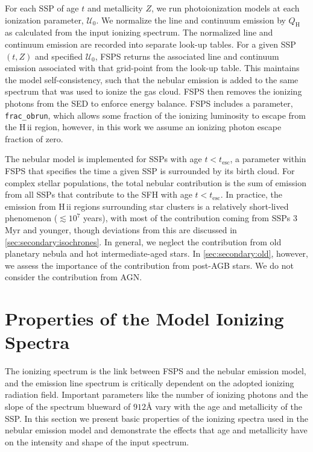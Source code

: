 \documentclass[twocolumn, tighten]{aastex61}
\newcommand{\Sec}[1]{\autoref{sec:#1}}
\newcommand{\FSPS}{{\sc FSPS}\xspace}
\newcommand{\hii}{H\,{\sc ii}\xspace}
\newcommand{\ang}{\ensuremath{\mbox{\AA}}}
\newcommand{\QH}{\ensuremath{Q_{\mathrm{H}}}}
\newcommand{\U}{\ensuremath{\mathcal{U}_{0}}}
\begin{document}
For each SSP of age $t$ and metallicity $Z$, we run photoionization models at each ionization parameter, \U{}. We normalize the line and continuum emission by \QH{} as calculated from the input ionizing spectrum. The normalized line and continuum emission are recorded into separate look-up tables. For a given SSP $(t, Z)$ and specified \U{}, \FSPS returns the associated line and continuum emission associated with that grid-point from the look-up table. This maintains the model self-consistency, such that the nebular emission is added to the same spectrum that was used to ionize the gas cloud. \FSPS then removes the ionizing photons from the SED to enforce energy balance. \FSPS includes a parameter, {\tt frac\_obrun}, which allows some fraction of the ionizing luminosity to escape from the \hii region, however, in this work we assume an ionizing photon escape fraction of zero.

The nebular model is implemented for SSPs with age $t < t_{\mathrm{esc}}$, a parameter within \FSPS that specifies the time a given SSP is surrounded by its birth cloud. For complex stellar populations, the total nebular contribution is the sum of emission from all SSPs that contribute to the SFH with age $t < t_{\mathrm{esc}}$. In practice, the emission from \hii regions surrounding star clusters is a relatively short-lived phenomenon ($\lesssim 10^7$ years), with most of the contribution coming from SSPs 3 Myr and younger, though deviations from this are discussed in \Sec{secondary:isochrones}. In general, we neglect the contribution from old planetary nebula and hot intermediate-aged stars. In \Sec{secondary:old}, however, we assess the importance of the contribution from post-AGB stars. We do not consider the contribution from AGN.

\section{Properties of the Model Ionizing Spectra}\label{sec:spectra}

The ionizing spectrum is the link between \FSPS and the nebular emission model, and the emission line spectrum is critically dependent on the adopted ionizing radiation field. Important parameters like the number of ionizing photons and the slope of the spectrum blueward of $912\ang$ vary with the age and metallicity of the SSP. In this section we present basic properties of the ionizing spectra used in the nebular emission model and demonstrate the effects that age and metallicity have on the intensity and shape of the input spectrum.
\end{document}
